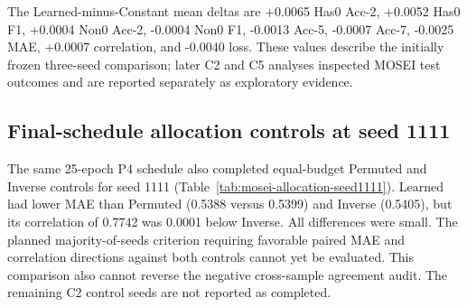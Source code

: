 The Learned-minus-Constant mean deltas are +0.0065 Has0 Acc-2, +0.0052 Has0
F1, +0.0004 Non0 Acc-2, -0.0004 Non0 F1, -0.0013 Acc-5, -0.0007 Acc-7,
-0.0025 MAE, +0.0007 correlation, and -0.0040 loss. These values describe
the initially frozen three-seed comparison; later C2 and C5 analyses inspected
MOSEI test outcomes and are reported separately as exploratory evidence.

\subsection{Final-schedule allocation controls at seed
1111}\label{final-schedule-allocation-controls}

The same 25-epoch P4 schedule also completed equal-budget Permuted and Inverse
controls for seed 1111 (Table~\ref{tab:mosei-allocation-seed1111}). Learned
had lower MAE than Permuted (0.5388 versus 0.5399) and Inverse (0.5405),
but its correlation of 0.7742 was 0.0001 below Inverse. All differences
were small. The planned majority-of-seeds criterion requiring favorable
paired MAE and correlation directions against both controls cannot yet be
evaluated. This comparison also cannot reverse the negative
cross-sample agreement audit. The remaining C2 control seeds are not
reported as completed.

